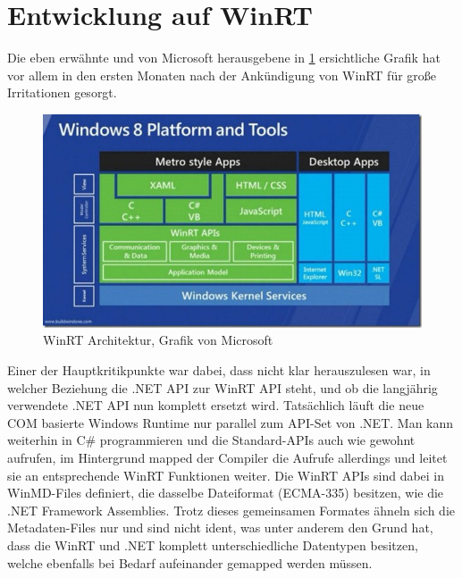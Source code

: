 \documentclass[a4paper,bibtotoc,oneside]{scrbook}
\begin{document}
\section[Entwicklung auf WinRT]{Entwicklung auf WinRT}
Die eben erwähnte und von Microsoft herausgebene in \ref{Abb1} ersichtliche Grafik hat vor allem in den ersten Monaten nach der Ankündigung von WinRT für große Irritationen gesorgt.
\newline
\begin{figure}[htbp]
\includegraphics[scale=0.90]{images/win8-platform-and-tools_thumb.jpg}
\caption[WinRT Architektur: Grafik von Microsoft. Quelle: \cite{dse11}]{WinRT Architektur, Grafik von Microsoft}\label{Abb1}
\end{figure}
\newline
Einer der Hauptkritikpunkte war dabei, dass nicht klar herauszulesen war, in welcher Beziehung die .NET API zur WinRT API steht, und ob die langjährig verwendete .NET API nun komplett ersetzt wird. \cite{dse11}
\newline
\newline
Tatsächlich läuft die neue COM basierte Windows Runtime nur parallel zum API-Set von .NET. Man kann weiterhin in C\# programmieren und die Standard-APIs auch wie gewohnt aufrufen, im Hintergrund mapped der Compiler die Aufrufe allerdings und leitet sie an entsprechende WinRT Funktionen weiter.
\newline
\newline
Die WinRT APIs sind dabei in WinMD-Files definiert, die dasselbe Dateiformat (ECMA-335) besitzen, wie die .NET Framework Assemblies. Trotz dieses gemeinsamen Formates ähneln sich die Metadaten-Files nur und sind nicht ident, was unter anderem den Grund hat, dass die WinRT und .NET komplett unterschiedliche Datentypen besitzen, welche ebenfalls bei Bedarf aufeinander gemapped werden müssen.
\end{document}
